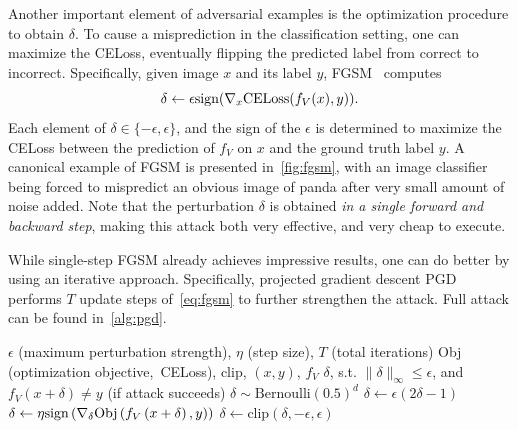 Another important element of adversarial examples is the optimization procedure to obtain $\delta$. To cause a misprediction in the classification setting, one can maximize the CELoss, eventually flipping the predicted label from correct to incorrect. Specifically, given image $x$ and its label $y$, FGSM~\cite{fgsm} computes 
\begin{equation}
    \delta\leftarrow\epsilon{\text{sign}}(\nabla_x\text{CELoss}(f_V(x),y))\text{.}
    \label{eq:fgsm}
\end{equation}
Each element of $\delta\in\{-\epsilon,\epsilon\}$, and the sign of the $\epsilon$ is determined to maximize the CELoss between the prediction of $f_V$ on $x$ and the ground truth label $y$. A canonical example of FGSM is presented in~\cref{fig:fgsm}, with an image classifier being forced to mispredict an obvious image of panda after very small amount of noise added. Note that the perturbation $\delta$ is obtained \textit{in a single forward and backward step}, making this attack both very effective, and very cheap to execute.

While single-step FGSM already achieves impressive results, one can do better by using an iterative approach. Specifically, projected gradient descent PGD~\cite{pgd} performs $T$ update steps of~\cref{eq:fgsm} to further strengthen the attack. Full attack can be found in~\cref{alg:pgd}.

\begin{algorithm}
\caption{PGD~\cite{pgd} algorithm.}
\label{alg:pgd}
\begin{algorithmic}
    \Require $\epsilon$ (maximum perturbation strength), $\eta$ (step size), $T$ (total iterations)
    \Require Obj (optimization objective,~\eg CELoss), clip, $(x,y)$, $f_V$
    \Ensure $\delta$, s.t. $\|\delta\|_\infty\leq\epsilon$, and $f_V(x+\delta)\neq y$ (if attack succeeds)
    \State $\delta\sim\text{Bernoulli}(0.5)^d$ 
    \State $\delta\gets\epsilon(2\delta-1)$ 
        \State $\delta\gets\eta{\text{sign}}\left(\nabla_\delta\text{Obj}\left(f_V\left(x+\delta\right),y\right)\right)$ 
        \State $\delta\gets\text{clip}(\delta,-\epsilon,\epsilon)$ 
    \EndFor
\end{algorithmic}
\end{algorithm}


